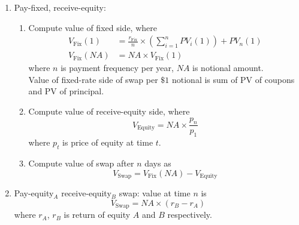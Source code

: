 \begin{method} 
\begin{enumerate}[label=\roman*.]
\setlength{\itemsep}{0pt}
\item Pay-fixed, receive-equity:
\begin{enumerate}[label=\arabic*.]
\setlength{\itemsep}{0pt}
\item Compute value of fixed side, where
\begin{align}
V_{\text{Fix}}(1) &= \frac{r_{\text{Fix}}}{n} \times \left( \sum\limits_{i=1}^n PV_{i}(1)\right) + PV_{n}(1) \nonumber \\
V_{\text{Fix}}(NA) &= NA \times V_\text{Fix}(1) \nonumber
\end{align}
where $n$ is payment frequency per year, $NA$ is notional amount.\\
Value of fixed-rate side of swap per $\$1$ notional is sum of PV of coupons and PV of principal.
\item Compute value of receive-equity side, where
\begin{equation}
V_{\text{Equity}} = NA \times \frac{p_n}{p_1} \nonumber
\end{equation}
where $p_t$ is price of equity at time $t$.
\item Compute value of swap after $n$ days as
\begin{equation}
V_{\text{Swap}} = V_{\text{Fix}}(NA) - V_{\text{Equity}} \nonumber
\end{equation}
\end{enumerate}
\item Pay-equity$_A$ receive-equity$_B$ swap: value at time $n$ is
\begin{equation}
V_{\text{Swap}} = NA \times (r_B - r_A) \nonumber
\end{equation}
where $r_A$, $r_B$ is return of equity $A$ and $B$ respectively. 
\end{enumerate}
\end{method}

